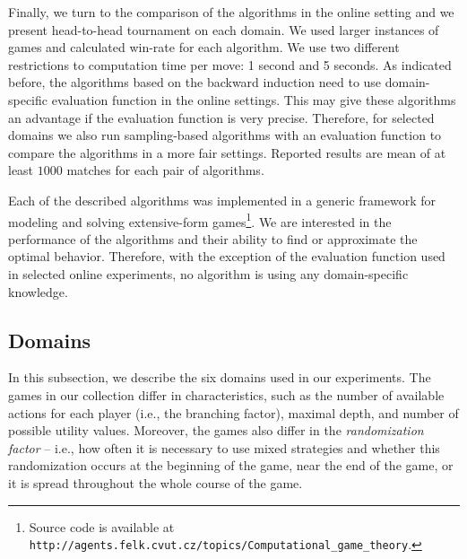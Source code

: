 Finally, we turn to the comparison of the algorithms in the online setting and we present head-to-head tournament on each domain.
We used larger instances of games and calculated win-rate for each algorithm.
We use two different restrictions to computation time per move: 1 second and 5 seconds. 
As indicated before, the algorithms based on the backward induction need to use domain-specific evaluation function in the online settings.
This may give these algorithms an advantage if the evaluation function is very precise.
Therefore, for selected domains we also run sampling-based algorithms with an evaluation function to compare the algorithms in a more fair settings.
Reported results are mean of at least $1000$ matches for each pair of algorithms.

Each of the described algorithms was implemented in a generic framework for modeling and solving extensive-form games\footnote{Source code is available at \texttt{http://agents.felk.cvut.cz/topics/Computational\_\newline game\_theory}.}.
We are interested in the performance of the algorithms and their ability to find or approximate the optimal behavior.
Therefore, with the exception of the evaluation function used in selected online experiments, no algorithm is using any domain-specific knowledge.


\subsection{Domains}\label{sec:eval:domains}

In this subsection, we describe the six domains used in our experiments.
The games in our collection differ in characteristics, such as the number of available actions for each player (i.e., the branching factor), maximal depth, and number of possible utility values.
Moreover, the games also differ in the \emph{randomization factor} -- i.e., how often it is necessary to use mixed strategies and whether this randomization occurs at the beginning of the game, near the end of the game, or it is spread throughout the whole course of the game.

